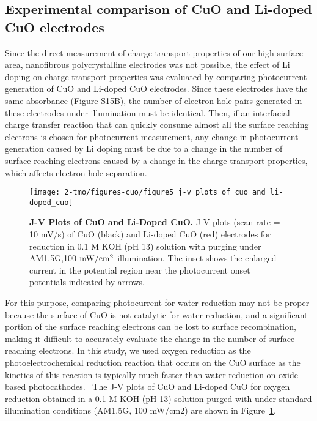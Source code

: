 \subsection{Experimental comparison of CuO and Li-doped CuO electrodes}
Since the direct measurement of charge transport properties of our high surface area, nanofibrous polycrystalline electrodes was not possible, the effect of Li doping on charge transport properties was evaluated by comparing photocurrent generation of CuO and Li-doped CuO electrodes.  Since these electrodes have the same absorbance (Figure S15B), the number of electron-hole pairs generated in these electrodes under illumination must be identical.  Then, if an interfacial charge transfer reaction that can quickly consume almost all the surface reaching electrons is chosen for photocurrent measurement, any change in photocurrent generation caused by Li doping must be due to a change in the number of surface-reaching electrons caused by a change in the charge transport properties, which affects electron-hole separation.

\begin{figure}
    \centering
    \texttt{[image: 2-tmo/figures-cuo/figure5\_j-v\_plots\_of\_cuo\_and\_li-doped\_cuo]}
    \caption{
    \textbf{J-V Plots of CuO and Li-Doped CuO.}
    J-V plots (scan rate = 10 mV/s) of CuO (black) and Li-doped CuO (red) electrodes for  reduction in 0.1 M KOH (pH 13) solution with  purging under AM1.5G,100 ${\rm mW/cm^2}$ illumination. The inset shows the enlarged current in the potential region near the photocurrent onset potentials indicated by arrows.
    }
    \label{cuo:fig:exp}
\end{figure}

For this purpose, comparing photocurrent for water reduction may not be proper because the surface of CuO is not catalytic for water reduction, and a significant portion of the surface reaching electrons can be lost to surface recombination, making it difficult to accurately evaluate the change in the number of surface-reaching electrons. In this study, we used oxygen reduction as the photoelectrochemical reduction reaction that occurs on the CuO surface as the kinetics of this reaction is typically much faster than water reduction on oxide-based photocathodes.~\cite{cardiel2017electrochemical,kang2016photoelectrochemical,read2012electrochemical,wheeler2017photoelectrochemical} The J-V plots of CuO and Li-doped CuO for oxygen reduction obtained in a 0.1 M KOH (pH 13) solution purged with  under standard illumination conditions (AM1.5G, 100 mW/cm2) are shown in Figure~\ref{cuo:fig:exp}.

